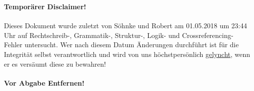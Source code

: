 \clearpage

\addtocounter{page}{-1}
\vspace*{\fill}

\begin{center}
{\bfseries Temporärer Disclaimer!}\\
~\\
Dieses Dokument wurde zuletzt von Söhnke und Robert am 01.05.2018 um 23:44 Uhr auf Rechtschreib-, Grammatik-, Struktur-, Logik- und Crossreferencing-Fehler untersucht. Wer nach diesem Datum Änderungen durchführt ist für die Integrität selbst verantwortlich und wird von uns höchstpersönlich \underline{gelyncht}, wenn er es versäumt diese zu bewahren!\\
~\\
{\bfseries Vor Abgabe Entfernen!}\\
\end{center}
\vspace*{\fill}